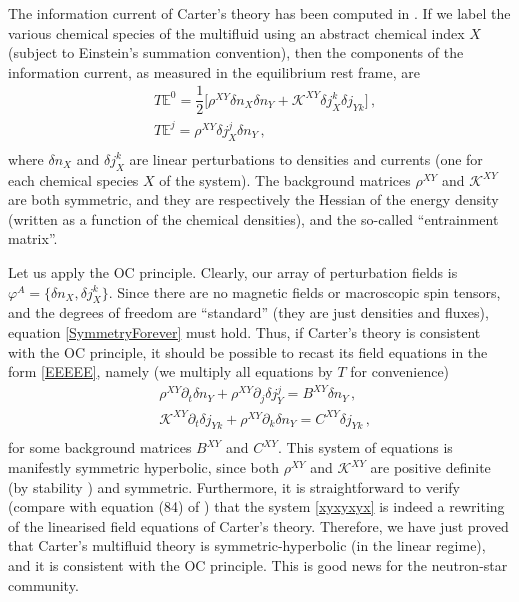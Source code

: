 \documentclass[a4paper, amsfonts, amssymb, amsmath, reprint, showkeys, nofootinbib, twoside, onecolumn,notitlepage]{revtex4-1}
\begin{document}
The information current of Carter's theory has been computed in \cite{GavassinoStabilityCarter2022}. If we label the various chemical species of the multifluid using an abstract chemical index  $X$ (subject to Einstein's summation convention), then the components of the information current, as measured in the equilibrium rest frame, are 
\begin{equation}\label{tobedifferent}
\begin{split}
& T\mathbb{E}^0 = \dfrac{1}{2} \bigg[ \rho^{XY} \delta n_X \delta n_Y + \mathcal{K}^{XY} \delta j^k_X \delta j_{Yk} \bigg] \, , \\
& T \mathbb{E}^j = \rho^{XY} \delta j_X^j \delta n_Y \, , \\
\end{split}
\end{equation}
where $\delta n_X$ and $\delta j_X^k$ are linear perturbations to densities and currents (one for each chemical species $X$ of the system). The background matrices $\rho^{XY}$ and $\mathcal{K}^{XY}$ are both symmetric, and they are respectively the Hessian of the energy density (written as a function of the chemical densities), and the so-called ``entrainment matrix''. 

Let us apply the OC principle. Clearly, our array of perturbation fields is  $\varphi^A=\{ \delta n_X, \delta j_X^k \}$.
Since there are no magnetic fields or macroscopic spin tensors, and the degrees of freedom are ``standard'' (they are just densities and fluxes), equation \eqref{SymmetryForever} must hold. Thus, if Carter's theory is consistent with the OC principle, it should be possible to recast its field equations in the form \eqref{EEEEE}, namely (we multiply all equations by $T$ for convenience)
\begin{equation}\label{xyxyxyx}
\begin{split}
& \rho^{XY} \partial_t \delta n_Y + \rho^{XY} \partial_j \delta j_Y^j = B^{XY} \delta n_Y \, , \\
& \mathcal{K}^{XY}\partial_t \delta j_{Yk} + \rho^{XY}\partial_k \delta n_Y = C^{XY}\delta j_{Yk} \, , \\
\end{split}
\end{equation}
for some background matrices $B^{XY}$ and $C^{XY}$. This system of equations is manifestly symmetric hyperbolic, since both $\rho^{XY}$ and $\mathcal{K}^{XY}$ are positive definite (by stability \cite{GavassinoStabilityCarter2022}) and symmetric. Furthermore, it is straightforward to verify (compare with equation (84) of \cite{GavassinoStabilityCarter2022}) that the system \eqref{xyxyxyx} is indeed a rewriting of the linearised field equations of Carter's theory. Therefore, we have just proved that Carter's multifluid theory is symmetric-hyperbolic (in the linear regime), and it is consistent with the OC principle. This is good news for the neutron-star community.
\end{document}
